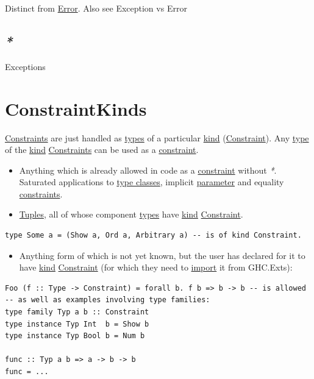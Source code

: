 \documentclass[a4paper,14pt,oneside]{book}
\begin{document}
Distinct from \hyperref[orgba8afa0]{Error}. Also see \label{orgec299cf}Exception vs Error

\section{\emph{*}}
\label{sec:org5842045}

\label{org19ff27f}Exceptions

\chapter{\label{org42e8056}ConstraintKinds}
\label{sec:orgc076257}
\hyperref[org733842a]{Constraints} are just handled as \hyperref[orgafd8fcb]{types} of a particular \hyperref[org7ff4669]{kind} (\hyperref[orgea0259d]{Constraint}).
Any \hyperref[orga7d212f]{type} of the \hyperref[org7ff4669]{kind} \hyperref[org733842a]{Constraints} can be used as a \hyperref[orgea0259d]{constraint}.
\begin{itemize}
\item Anything which is already allowed in code as a \hyperref[orgea0259d]{constraint} without \emph{*}. Saturated applications to \hyperref[orgce4c4bf]{type classes}, implicit \hyperref[org410e2cd]{parameter} and equality \hyperref[org733842a]{constraints}.
\item \hyperref[orgf81305e]{Tuples}, all of whose component \hyperref[orgafd8fcb]{types} have \hyperref[org7ff4669]{kind} \hyperref[orgea0259d]{Constraint}.
\end{itemize}
\begin{verbatim}
type Some a = (Show a, Ord a, Arbitrary a) -- is of kind Constraint.
\end{verbatim}
\begin{itemize}
\item Anything form of which is not yet known, but the user has declared for it to have \hyperref[org7ff4669]{kind} \hyperref[orgea0259d]{Constraint} (for which they need to \hyperref[orgc45c956]{import} it from GHC.Exts):
\end{itemize}
\begin{verbatim}
Foo (f :: Type -> Constraint) = forall b. f b => b -> b -- is allowed
-- as well as examples involving type families:
type family Typ a b :: Constraint
type instance Typ Int  b = Show b
type instance Typ Bool b = Num b

func :: Typ a b => a -> b -> b
func = ...
\end{verbatim}
\end{document}
